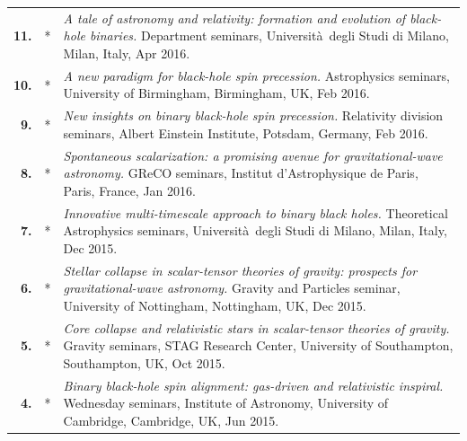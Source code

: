 {\begin{longtable}{rp{0.3cm}p{15.8cm}}
%
\textbf{11.} & * & \textit{A tale of astronomy and relativity: formation and evolution of black-hole binaries.}
\newline{}
Department seminars, Università degli Studi di Milano, Milan, Italy, Apr 2016.
\vspace{0.05cm}\\
%
\textbf{10.} & * & \textit{A new paradigm for black-hole spin precession.}
\newline{}
Astrophysics seminars, University of Birmingham, Birmingham, UK, Feb 2016.
\vspace{0.05cm}\\
%
\textbf{9.} & * & \textit{New insights on binary black-hole spin precession.}
\newline{}
Relativity division seminars, Albert Einstein Institute, Potsdam, Germany, Feb 2016.
\vspace{0.05cm}\\
%
\textbf{8.} & * & \textit{Spontaneous scalarization: a promising avenue for gravitational-wave astronomy.}
\newline{}
GReCO seminars, Institut d'Astrophysique de Paris, Paris, France, Jan 2016.
\vspace{0.05cm}\\
%
\textbf{7.} & * & \textit{Innovative multi-timescale approach to binary black holes.}
\newline{}
Theoretical Astrophysics seminars, Università degli Studi di Milano, Milan, Italy, Dec 2015.
\vspace{0.05cm}\\
%
\textbf{6.} & * & \textit{Stellar collapse in scalar-tensor theories of gravity: prospects for gravitational-wave astronomy.}
\newline{}
Gravity and Particles seminar, University of Nottingham, Nottingham, UK, Dec 2015.
\vspace{0.05cm}\\
%
\textbf{5.} & * & \textit{Core collapse and relativistic stars in scalar-tensor theories of gravity.}
\newline{}
Gravity seminars, STAG Research Center, University of Southampton, Southampton, UK, Oct 2015.
\vspace{0.05cm}\\
%
\textbf{4.} & * & \textit{Binary black-hole spin alignment: gas-driven and relativistic inspiral.}
\newline{}
Wednesday seminars, Institute of Astronomy, University of Cambridge, Cambridge, UK, Jun 2015.
\vspace{0.05cm}\\

\end{longtable}}
